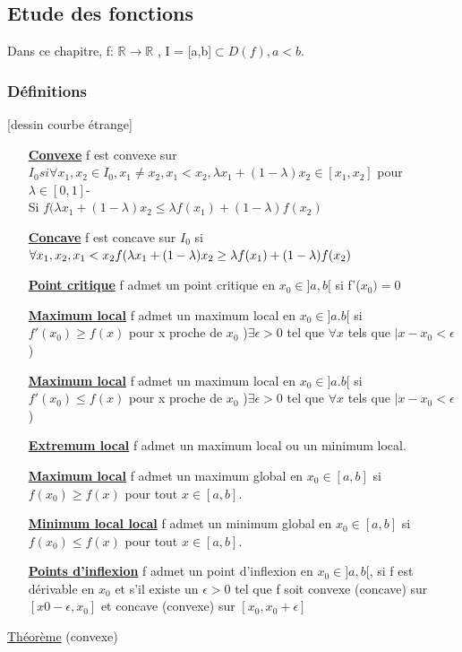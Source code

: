 \documentclass[12pt,a4paper]{article}
\newcommand{\evid}[1]{\textbf{\underline{#1}}}
\newcommand{\R}{\ensuremath{\mathbb{R}} }
\newcommand{\rtor}{\ensuremath{\R \to \R} }
\newcommand{\Theoreme}{\underline{Théorème} }
\begin{document}
{\subsection{Etude des fonctions}
Dans ce chapitre, f: \rtor , I = [a,b]$ \subset D(f), a < b$.
\subsubsection{Définitions}
[dessin courbe étrange]\\
\begin{itemize}
	\item[\evid{Convexe}] f est convexe sur $I_0 si \forall x_1, x_2 \in I_0, x_1 \neq x_2, x_1 < x_2, \lambda x_1 + (1-\lambda)x_2 \in [x_1,x_2]$ pour $\lambda \in [0,1]$-\\
Si $f(\lambda x_1 + (1-\lambda)x_2 \leq \lambda f(x_1) + (1-\lambda) f(x_2)$
\item[\evid{Concave}] f est concave sur $I_0$ si $\forall x_1, x_2, x_1 < x_2\\
f(\lambda x_1 + (1-\lambda)x_2 \geq \lambda f(x_1) + (1-\lambda) f(x_2)$
	\item[\evid{Point critique}] f admet un point critique en $x_0 \in ]a,b[$ si f'($x_0) = 0$
	\item[\evid{Maximum local}] f admet un maximum local en $x_0 \in ]a.b[$ si $f'(x_0) \geq f(x)$ pour x proche de $x_0$ )$\exists \epsilon > 0$ tel que $\forall x$ tels que $|x-x_0 < \epsilon$)
	\item[\evid{Maximum local}] f admet un maximum local en $x_0 \in ]a.b[$ si $f'(x_0) \leq f(x)$ pour x proche de $x_0$ )$\exists \epsilon > 0$ tel que $\forall x$ tels que $|x-x_0 < \epsilon$)
	\item[\evid{Extremum local}] f admet un maximum local ou un minimum local.
	\item[\evid{Maximum local}] f admet un maximum global en $x_0 \in [a,b]$ si $f(x_0) \geq f(x)$ pour tout $x \in [a,b]$.
	\item[\evid{Minimum local local}] f admet un minimum global en $x_0 \in [a,b]$ si $f(x_0) \leq f(x)$ pour tout $x \in [a,b]$.
	\item[\evid{Points d'inflexion}] f admet un point d'inflexion en $x_0 \in ]a,b[$, si f est dérivable en $x_0$ et s'il existe un $\epsilon > 0$ tel que f soit convexe (concave) sur $[x0 -  \epsilon, x_0]$ et concave (convexe) sur $[x_0, x_0 + \epsilon]$
\end{itemize}
\begin{boite}
	\Theoreme (convexe)\\

\end{boite}}
\end{document}
